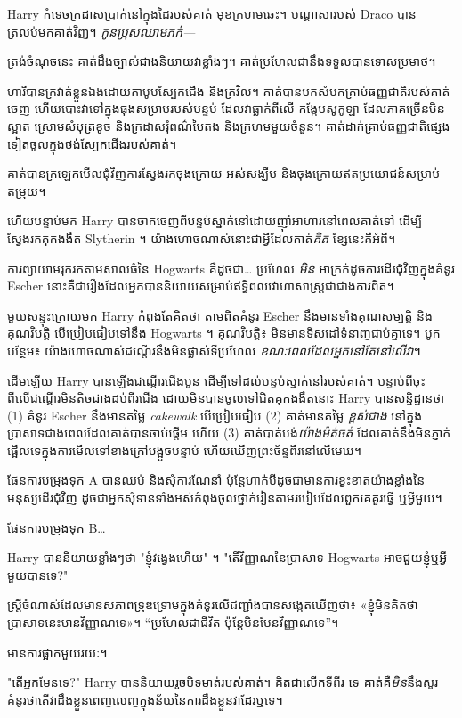 Harry កំទេចក្រដាសប្រាក់នៅក្នុងដៃរបស់គាត់ មុខក្រហមឆេះ។ បណ្តាសារបស់ Draco បានត្រលប់មកគាត់វិញ។ \emph{កូនប្រុសឈាមភក់—}

ត្រង់​ចំណុច​នេះ គាត់​ដឹង​ច្បាស់​ជាង​និយាយ​វា​ខ្លាំងៗ។ គាត់​ប្រហែល​ជា​នឹង​ទទួល​បាន​ទោស​ប្រមាថ។

ហារី​បាន​ក្រវាត់​ខ្លួន​ឯង​ដោយ​កាបូប​ស្បែក​ជើង និង​ក្រវិល។ គាត់បានបកសំបកគ្រាប់ធញ្ញជាតិរបស់គាត់ចេញ ហើយបោះវាទៅក្នុងធុងសម្រាមរបស់បន្ទប់ ដែលវាធ្លាក់ពីលើ កង្កែបសូកូឡា ដែលភាគច្រើនមិនស្អាត ស្រោមសំបុត្រខូច និងក្រដាសរុំពណ៌បៃតង និងក្រហមមួយចំនួន។ គាត់​ដាក់​គ្រាប់​ធញ្ញជាតិ​ផ្សេង​ទៀត​ចូល​ក្នុង​ថង់​ស្បែក​ជើង​របស់​គាត់។

គាត់បានក្រឡេកមើលជុំវិញការស្វែងរកចុងក្រោយ អស់សង្ឃឹម និងចុងក្រោយឥតប្រយោជន៍សម្រាប់តម្រុយ។

ហើយបន្ទាប់មក Harry បានចាកចេញពីបន្ទប់ស្នាក់នៅដោយញ៉ាំអាហារនៅពេលគាត់ទៅ ដើម្បីស្វែងរកគុកងងឹត Slytherin ។ យ៉ាងហោចណាស់នោះជាអ្វីដែលគាត់\emph{គិត} ខ្សែនេះគឺអំពី។

ការព្យាយាមរុករកតាមសាលធំនៃ Hogwarts គឺដូចជា… ប្រហែល \emph{មិន} អាក្រក់ដូចការដើរជុំវិញក្នុងគំនូរ Escher នោះគឺជារឿងដែលអ្នកបាននិយាយសម្រាប់ឥទ្ធិពលវោហាសាស្ត្រជាជាងការពិត។

មួយសន្ទុះក្រោយមក Harry កំពុងតែគិតថា តាមពិតគំនូរ Escher នឹងមានទាំងគុណសម្បត្តិ និងគុណវិបត្តិ បើប្រៀបធៀបទៅនឹង Hogwarts ។ គុណវិបត្តិ៖ មិនមានទិសដៅទំនាញជាប់គ្នាទេ។ បូកបន្ថែម៖ យ៉ាងហោចណាស់ជណ្តើរនឹងមិនផ្លាស់ទីប្រហែល \emph{ខណៈពេលដែលអ្នកនៅតែនៅលើវា}។

ដើមឡើយ Harry បានឡើងជណ្តើរជើងបួន ដើម្បីទៅដល់បន្ទប់ស្នាក់នៅរបស់គាត់។ បន្ទាប់ពីចុះពីលើជណ្តើរមិនតិចជាងដប់ពីរជើង ដោយមិនបានចូលទៅជិតគុកងងឹតនោះ Harry បានសន្និដ្ឋានថា (1) គំនូរ Escher នឹងមានតម្លៃ \emph{cakewalk} បើប្រៀបធៀប (2) គាត់មានតម្លៃ \emph{ ខ្ពស់ជាង } នៅក្នុងប្រាសាទជាងពេលដែលគាត់បានចាប់ផ្តើម ហើយ (3) គាត់បាត់បង់\emph{យ៉ាងម៉ត់ចត់} ដែលគាត់នឹងមិនភ្ញាក់ផ្អើលទេក្នុងការមើលទៅខាងក្រៅបង្អួចបន្ទាប់ ហើយឃើញព្រះច័ន្ទពីរនៅលើមេឃ។

ផែនការបម្រុងទុក A បានឈប់ និងសុំការណែនាំ ប៉ុន្តែហាក់បីដូចជាមានការខ្វះខាតយ៉ាងខ្លាំងនៃមនុស្សដើរជុំវិញ ដូចជាអ្នកសុំទានទាំងអស់កំពុងចូលថ្នាក់រៀនតាមរបៀបដែលពួកគេគួរធ្វើ ឬអ្វីមួយ។

ផែនការបម្រុងទុក B…

Harry បាននិយាយខ្លាំងៗថា "ខ្ញុំវង្វេងហើយ" ។ "តើវិញ្ញាណនៃប្រាសាទ Hogwarts អាចជួយខ្ញុំឬអ្វីមួយបានទេ?"

ស្ត្រី​ចំណាស់​ដែល​មាន​សភាព​ទ្រុឌទ្រោម​ក្នុង​គំនូរ​លើ​ជញ្ជាំង​បាន​សង្កេត​ឃើញ​ថា​៖ «​ខ្ញុំ​មិន​គិត​ថា​ប្រាសាទ​នេះ​មាន​វិញ្ញាណ​ទេ​»​។ “ប្រហែល​ជា​ជីវិត ប៉ុន្តែ​មិន​មែន​វិញ្ញាណ​ទេ”។

មានការផ្អាកមួយរយៈ។

"តើអ្នកមែនទេ?" Harry បាននិយាយរួចបិទមាត់របស់គាត់។ គិតជាលើកទីពីរ ទេ គាត់គឺ\emph{មិន}នឹងសួរគំនូរថាតើវាដឹងខ្លួនពេញលេញក្នុងន័យនៃការដឹងខ្លួនវាដែរឬទេ។

